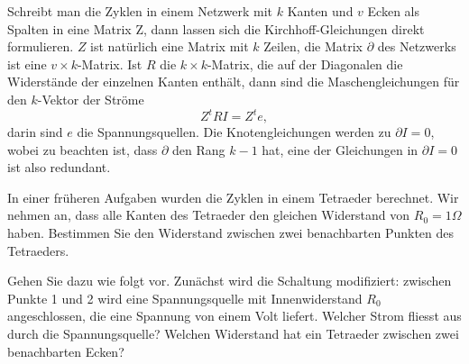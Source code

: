 Schreibt man die Zyklen in einem Netzwerk mit $k$ Kanten und $v$ Ecken
als Spalten in eine Matrix Z,
dann lassen sich die Kirchhoff-Gleichungen direkt formulieren.
$Z$ ist natürlich eine Matrix mit $k$ Zeilen, die Matrix $\partial$
des Netzwerks ist eine $v\times k$-Matrix.
Ist $R$ die $k\times k$-Matrix, die auf der Diagonalen die Widerstände der
einzelnen Kanten enthält, dann sind die Maschengleichungen für den
$k$-Vektor der Ströme 
\[
Z^tRI=Z^te,
\]
darin sind $e$ die Spannungsquellen.
Die Knotengleichungen werden zu $\partial I=0$, wobei zu beachten ist,
dass $\partial$ den Rang $k-1$ hat, eine der Gleichungen in $\partial I=0$ 
ist also redundant.

In einer früheren Aufgaben wurden die Zyklen in einem Tetraeder berechnet.
Wir nehmen an, dass alle Kanten des Tetraeder den gleichen Widerstand von
$R_0=1\Omega$ haben. Bestimmen Sie den Widerstand zwischen zwei benachbarten
Punkten des Tetraeders.


\begin{hinweis}
Gehen Sie dazu wie folgt vor.
Zunächst wird die Schaltung modifiziert: zwischen Punkte 1 und 2 wird eine
Spannungsquelle mit Innenwiderstand $R_0$ angeschlossen,
die eine Spannung von einem Volt liefert.
Welcher Strom fliesst aus durch die Spannungsquelle? Welchen Widerstand
hat ein Tetraeder zwischen zwei benachbarten Ecken?
\end{hinweis}

